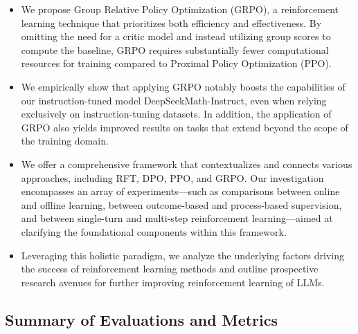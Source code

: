 \begin{itemize}[topsep=0pt]
    \item We propose Group Relative Policy Optimization (GRPO), a reinforcement learning technique that prioritizes both efficiency and effectiveness. By omitting the need for a critic model and instead utilizing group scores to compute the baseline, GRPO requires substantially fewer computational resources for training compared to Proximal Policy Optimization (PPO).
    \item We empirically show that applying GRPO notably boosts the capabilities of our instruction-tuned model DeepSeekMath-Instruct, even when relying exclusively on instruction-tuning datasets. In addition, the application of GRPO also yields improved results on tasks that extend beyond the scope of the training domain.
    \item We offer a comprehensive framework that contextualizes and connects various approaches, including RFT, DPO, PPO, and GRPO. Our investigation encompasses an array of experiments—such as comparisons between online and offline learning, between outcome-based and process-based supervision, and between single-turn and multi-step reinforcement learning—aimed at clarifying the foundational components within this framework.
    \item Leveraging this holistic paradigm, we analyze the underlying factors driving the success of reinforcement learning methods and outline prospective research avenues for further improving reinforcement learning of LLMs.
\end{itemize}

\subsection{Summary of Evaluations and Metrics}

